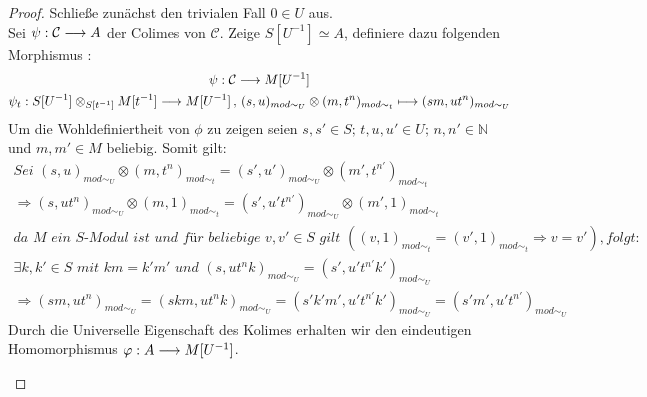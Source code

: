 \documentclass[10pt,a4paper]{report}
\newcommand{\comment}[1]{}
\newcommand{\functionfront}[3]{\nolinebreak{#1:#2 \longrightarrow #3}}
\newcommand{\function}[5]{\nolinebreak{#1:#2 \longrightarrow #3 \, , \, #4 \longmapsto #5}}
\newcommand{\Tensor}[3]{#1 \otimes_{#2} #3}
\newcommand{\tensor}[3]{#1 \otimes #3}
\newcommand{\lok}[2]{#1 [#2^{-1}]}
\newcommand{\loke}[3]{(#1,#2)_{mod\sim_{#3}}}
\begin{document}
\begin{proof}
Schließe zunächst den trivialen Fall $0 \in U$ aus.\\
Sei $\functionfront{\psi}{\mathcal{C}}{A}$ der Colimes von $\mathcal{C}$. Zeige $\lok{S}{U} \simeq A$, definiere dazu folgenden Morphismus \comment{\label{das phi ein Mophismus ist überlasse ich dem Leser}}:
\begin{gather*}
\functionfront{\psi}{\mathcal{C}}{\lok{M}{U}} \\
\comment{
\function{\psi_{\Tensor{\lok{S}{U}}{\lok{S}{t}}{\lok{M}{t}}}}{\Tensor{\lok{S}{U}}{\lok{S}{t}}{\lok{M}{t}}}{\lok{M}{U}}{\tensor{\loke{s}{u}{U}}{\lok{S}{t}}{\loke{m}{t^n}{t}}}{\loke{sm}{ut^n}{U}} \\
}
\function{\psi_{t}}{\Tensor{\lok{S}{U}}{\lok{S}{t}}{\lok{M}{t}}}{\lok{M}{U}}{\tensor{\loke{s}{u}{U}}{\lok{S}{t}}{\loke{m}{t^n}{t}}}{\loke{sm}{ut^n}{U}}
\end{gather*}
Um die Wohldefiniertheit von $\phi$ zu zeigen seien $s,s' \in S ; \, t,u,u' \in U ; \, n,n' \in \mathbb{N}$ und $m,m' \in M$ beliebig. Somit gilt:
\begin{gather*}
\textit{Sei }\tensor{\loke{s}{u}{U}}{\lok{S}{t}}{\loke{m}{t^n}{t}} = \tensor{\loke{s'}{u'}{U}}{\lok{S}{t}}{\loke{m'}{t^{n'}}{t}} \\
\Rightarrow \tensor{\loke{s}{ut^n}{U}}{\lok{S}{t}}{\loke{m}{1}{t}} = \tensor{\loke{s'}{u't^{n'}}{U}}{\lok{S}{t}}{\loke{m'}{1}{t}} \\
\textit{da M ein S-Modul ist und für beliebige $v,v' \in S$ gilt } (\loke{v}{1}{t} = \loke{v'}{1}{t} \Rightarrow v = v') { ,folgt:}\\
\comment{\label{Es ist nich ganz klar, dass das so schon folgt}}
\exists k,k' \in S \textit{ mit } km = k'm' \textit{ und } \loke{s}{ut^nk}{U} = \loke{s'}{u't^{n'}k'}{U} \\
\Rightarrow \loke{sm}{ut^n}{U} = \loke{skm}{ut^nk}{U} = \loke{s'k'm'}{u't^{n'}k'}{U} =\loke{s'm'}{u't^{n'}}{U} 
\end{gather*}
Durch die Universelle Eigenschaft des Kolimes erhalten wir den eindeutigen Homomorphismus $\functionfront{\varphi}{A}{\lok{M}{U}}$.
\begin{center}

\end{center}
\end{proof}
\end{document}
